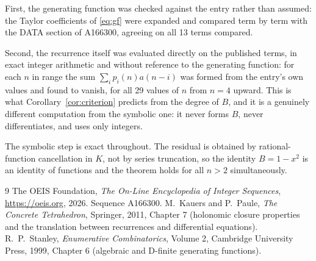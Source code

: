 \documentclass[11pt,a4paper]{article}
\theoremstyle{plain}
\theoremstyle{definition}
\begin{document}
First, the generating function was checked against the entry rather than assumed: the
Taylor coefficients of \eqref{eq:gf} were expanded and compared term by term with the DATA
section of A166300, agreeing on all 13 terms compared.

Second, the recurrence itself was evaluated directly on the published terms, in exact
integer arithmetic and without reference to the generating function: for each $n$ in range
the sum $\sum_{i}p_{i}(n)a(n-i)$ was formed from the entry's own values and found to
vanish, for all 29 values of $n$ from $n=4$ upward. This is what
Corollary~\ref{cor:criterion} predicts from the degree of $B$, and it is a genuinely
different computation from the symbolic one: it never forms $B$, never differentiates, and
uses only integers.

The symbolic step is exact throughout. The residual is obtained by rational-function
cancellation in $K$, not by series truncation, so the identity $B=1 - x^{2}$ is an
identity of functions and the theorem holds for all $n>2$ simultaneously.

\begin{thebibliography}{9}
 The OEIS Foundation, \emph{The On-Line Encyclopedia of Integer Sequences},
\url{https://oeis.org}, 2026. Sequence A166300.
 M.~Kauers and P.~Paule, \emph{The Concrete Tetrahedron}, Springer, 2011,
Chapter 7 (holonomic closure properties and the translation between recurrences and
differential equations).
 R.~P.~Stanley, \emph{Enumerative Combinatorics}, Volume 2, Cambridge
University Press, 1999, Chapter 6 (algebraic and D-finite generating functions).
\end{thebibliography}
\end{document}
